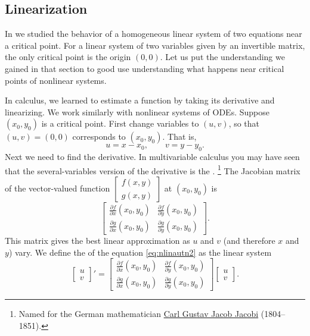 \subsection{Linearization}

In  we studied the behavior of a homogeneous
linear system of two equations near a critical point.  For a linear system
of two variables given by an invertible matrix, the only critical point is
the origin $(0,0)$.
Let us put the understanding we gained in that section to good use
understanding what happens near critical points of nonlinear systems.

In calculus, we learned to estimate a function by taking its
derivative and linearizing.  We work similarly with nonlinear systems of ODEs.
Suppose $(x_0,y_0)$ is a critical point.
First change variables to $(u,v)$, so that $(u,v)=(0,0)$ corresponds to
$(x_0,y_0)$.  That is,
\begin{equation*}
u=x-x_0, \qquad v=y-y_0 .
\end{equation*}
Next we need to find the derivative.  In multivariable calculus you may
have seen that the several-variables version of the derivative is the
\emph{}.%
\footnote{Named for the German mathematician
\href{https://en.wikipedia.org/wiki/Carl_Gustav_Jacob_Jacobi}{Carl Gustav Jacob Jacobi}
(1804--1851).}
The Jacobian matrix of 
the vector-valued function
$\left[ \begin{smallmatrix} f(x,y) \\ g(x,y) \end{smallmatrix} \right]$
at $(x_0,y_0)$ is 
\begin{equation*}
\begin{bmatrix}
\frac{\partial f}{\partial x}(x_0,y_0) &
\frac{\partial f}{\partial y}(x_0,y_0) \\
\frac{\partial g}{\partial x}(x_0,y_0) &
\frac{\partial g}{\partial y}(x_0,y_0)
\end{bmatrix} .
\end{equation*}
This matrix gives the best linear approximation as $u$ and $v$ (and
therefore $x$ and $y$) vary.  
We define the \emph{} of the equation
\eqref{eq:nlinautn2} as the linear system
\begin{equation*}
\begin{bmatrix} u \\ v \end{bmatrix} ' =
\begin{bmatrix}
\frac{\partial f}{\partial x}(x_0,y_0) &
\frac{\partial f}{\partial y}(x_0,y_0) \\
\frac{\partial g}{\partial x}(x_0,y_0) &
\frac{\partial g}{\partial y}(x_0,y_0)
\end{bmatrix} 
\begin{bmatrix} u \\ v \end{bmatrix} .
\end{equation*}

